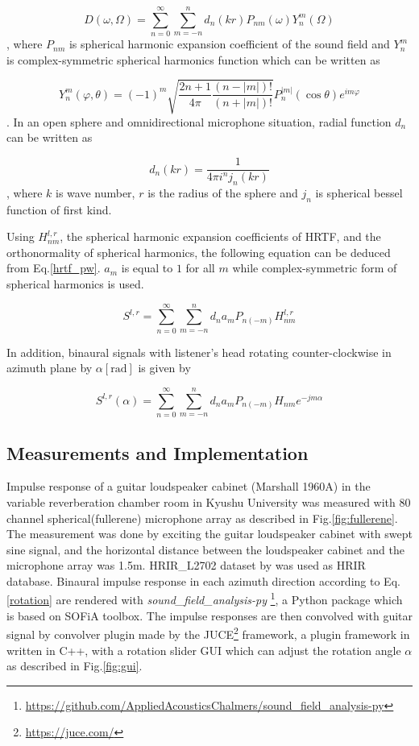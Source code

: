 \documentclass[convention,e-brief]{aesconf-current}
\begin{document}
\begin{equation}
    D\left(\omega, \Omega\right)=\sum_{n=0}^{\infty} \sum_{m=-n}^{n} d_{n}(k r) P_{n m}(\omega) Y_{n}^{m}\left(\Omega\right)
\end{equation}
, where $P_{nm}$ is spherical harmonic expansion coefficient of the sound field and $Y^{m}_n$ is complex-symmetric spherical harmonics function which can be written as

$$
    Y_{n}^{m}(\varphi, \theta) =(-1)^{m} \sqrt{\frac{2 n+1}{4 \pi} \frac{(n-|m|) !}{(n+|m|) !}} P_{n}^{|m|}(\cos \theta) e^{i m \varphi}
$$
.
In an open sphere and omnidirectional microphone situation, radial function $d_n$ can be written as

$$
    d_{n}(kr)=\frac{1}{4 \pi i^{n} j_{n}\left(k r\right)}
$$
, where $k$ is wave number, $r$ is the radius of the sphere and $j_n$ is spherical bessel function of first kind.

Using $H_{nm}^{l,r}$, the spherical harmonic expansion coefficients of HRTF, and the orthonormality of spherical harmonics, the following equation can be deduced from Eq.\ref{hrtf_pw}. $a_{m}$ is equal to $1$ for all $m$ while complex-symmetric form of spherical harmonics is used.

\begin{equation}
    \label{binaural_signal}
    S^{l, r} =\sum_{n=0}^{\infty} \sum_{m=-n}^{n} d_{n} a_{m} P_{n(-m)} H_{n m}^{l,r}
\end{equation}

In addition, binaural signals with listener's head rotating counter-clockwise in azimuth plane by $\alpha[\mathrm{rad}]$ is given by

\begin{equation}
    \label{rotation}
    S^{l, r}(\alpha)=\sum_{n=0}^{\infty} \sum_{m=-n}^{n} d_{n} a_{m} P_{n(-m)} H_{n m} e^{-j m \alpha}
\end{equation}

\subsection{Measurements and Implementation}

Impulse response of a guitar loudspeaker cabinet (Marshall 1960A) in the variable reverberation chamber  room in Kyushu University was measured with 80 channel spherical(fullerene) microphone array\cite{Omoto2015-wq} as described in Fig.\ref{fig:fullerene}.
The measurement was done by exciting the guitar loudspeaker cabinet with swept sine signal, and the horizontal distance between the loudspeaker cabinet and the microphone array was 1.5m.
HRIR\_L2702 dataset by \citet{Bernschutz2013-zy} was used as HRIR database.
Binaural impulse response in each azimuth direction according to Eq.\ref{rotation} are rendered with \emph{sound\_field\_analysis-py} \footnote{\url{https://github.com/AppliedAcousticsChalmers/sound_field_analysis-py}}, a Python package which is based on SOFiA toolbox\cite{Bernschutz2011-rj}.
The impulse responses are then convolved with guitar signal by convolver plugin made by the JUCE\footnote{\url{https://juce.com/}} framework, a plugin framework in written in C++, with a rotation slider GUI which can adjust the rotation angle $\alpha$ as described in Fig.\ref{fig:gui}.
\end{document}
